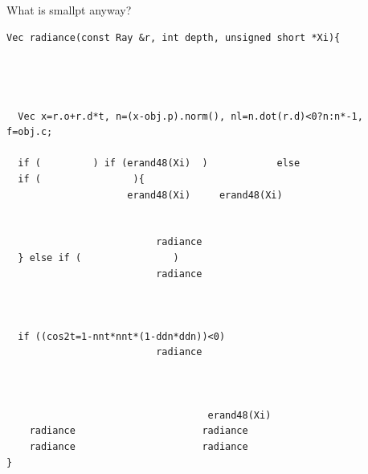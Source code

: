 \documentclass[8pt]{beamer}
\begin{document}
\begin{frame}[fragile]{What is smallpt anyway?}
\footnotesize
\begin{verbatim}
Vec radiance(const Ray &r, int depth, unsigned short *Xi){ 
                                                                      
                                                                      
                                                                   
                                                            
  Vec x=r.o+r.d*t, n=(x-obj.p).norm(), nl=n.dot(r.d)<0?n:n*-1, f=obj.c; 
                                                                         
  if (         ) if (erand48(Xi)  )            else 
  if (                ){                  
                     erand48(Xi)     erand48(Xi)
                                                                  
                                                                   
                          radiance
  } else if (                )            
                          radiance
                                                                         
                                                                        
                                                                     
  if ((cos2t=1-nnt*nnt*(1-ddn*ddn))<0)
                          radiance
                                                                       
                                                                        
                                                                         
                                   erand48(Xi)
    radiance                      radiance
    radiance                      radiance
} 
\end{verbatim}
\end{frame}
\end{document}
